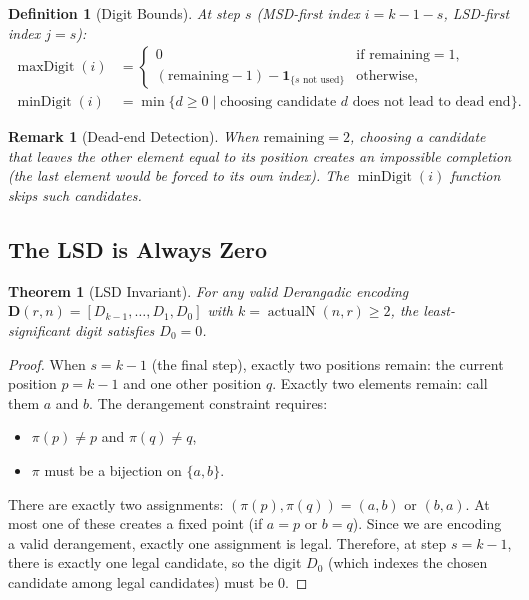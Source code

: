\documentclass[11pt,a4paper]{article}
\newtheorem{theorem}{Theorem}[section]
\newtheorem{definition}{Definition}[section]
\newtheorem{remark}{Remark}[section]
\newcommand{\actualN}{\operatorname{actualN}}
\newcommand{\maxd}[1]{\operatorname{maxDigit}(#1)}
\newcommand{\mind}[1]{\operatorname{minDigit}(#1)}
\begin{document}
    \begin{definition}[Digit Bounds]
        \label{def:digit-bounds}
        At step $s$ (MSD-first index $i = k-1-s$, LSD-first index $j = s$):
        \begin{align}
            \maxd{i} &= \begin{cases}
                            0 & \text{if } \text{remaining} = 1,\\
                            (\text{remaining} - 1) - \mathbf{1}_{\{s \text{ not used}\}} & \text{otherwise},
            \end{cases} \label{eq:maxdigit}\\
            \mind{i} &= \min\{ d \geq 0 \mid \text{choosing candidate } d \text{ does not lead to dead end} \}. \label{eq:mindigit}
        \end{align}
    \end{definition}

    \begin{remark}[Dead-end Detection]
        When $\text{remaining} = 2$, choosing a candidate that leaves the other
        element equal to its position creates an impossible completion (the last
        element would be forced to its own index). The $\mind{i}$ function skips
        such candidates.
    \end{remark}

    \subsection{The LSD is Always Zero}

    \begin{theorem}[LSD Invariant]
        \label{thm:lsd-zero}
        For any valid Derangadic encoding $\mathbf{D}(r,n) = [D_{k-1}, \dots, D_1, D_0]$
        with $k = \actualN(n,r) \geq 2$, the least-significant digit satisfies $D_0 = 0$.
    \end{theorem}

    \begin{proof}
        When $s = k-1$ (the final step), exactly two positions remain: the current
        position $p = k-1$ and one other position $q$. Exactly two elements remain:
        call them $a$ and $b$. The derangement constraint requires:
        \begin{itemize}
            \item $\pi(p) \neq p$ and $\pi(q) \neq q$,
            \item $\pi$ must be a bijection on $\{a,b\}$.
        \end{itemize}
        There are exactly two assignments: $(\pi(p),\pi(q)) = (a,b)$ or $(b,a)$.
        At most one of these creates a fixed point (if $a=p$ or $b=q$). Since we
        are encoding a valid derangement, exactly one assignment is legal.
        Therefore, at step $s=k-1$, there is exactly one legal candidate, so the
        digit $D_0$ (which indexes the chosen candidate among legal candidates)
        must be $0$.
    \end{proof}
\end{document}
